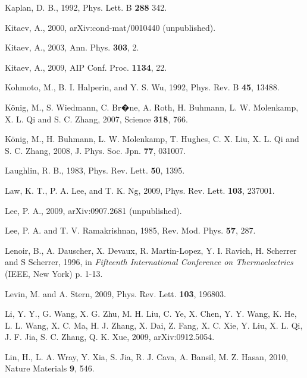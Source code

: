 \documentclass[twocolumn,floatfix,showpacs,rmp,aps]{revtex4}
\begin{document}
\begin{thebibliography}{99}
Kaplan, D. B., 1992,
Phys. Lett. B {\bf 288} 342.

Kitaev, A., 2000,
arXiv:cond-mat/0010440 (unpublished).

Kitaev, A., 2003,
Ann. Phys. {\bf 303}, 2.

Kitaev, A., 2009,
AIP Conf. Proc. {\bf 1134}, 22.

Kohmoto, M., B. I. Halperin, and Y. S. Wu, 1992,
Phys. Rev. B {\bf 45}, 13488.

K\"onig, M., S. Wiedmann, C. Br�ne, A. Roth, H. Buhmann, L. W. Molenkamp,
X. L. Qi and S. C. Zhang, 2007,
Science {\bf 318}, 766.

K\"onig, M., H. Buhmann, L. W. Molenkamp, T. Hughes, C. X. Liu,
X. L. Qi and S. C. Zhang, 2008,
J. Phys. Soc. Jpn. {\bf 77}, 031007.

Laughlin, R. B., 1983,
Phys. Rev. Lett. {\bf 50}, 1395.

Law, K. T., P. A. Lee, and T. K. Ng, 2009,
Phys. Rev. Lett. {\bf 103}, 237001.

Lee, P. A., 2009,
arXiv:0907.2681 (unpublished).

Lee, P. A.  and T. V. Ramakrishnan, 1985,
Rev. Mod. Phys. {\bf 57}, 287.

Lenoir, B., A. Dauscher, X. Devaux, R. Martin-Lopez, Y. I. Ravich,
H. Scherrer and S Scherrer, 1996, in
{\it Fifteenth International Conference on Thermoelectrics}
(IEEE, New York) p. 1-13.

Levin, M. and A. Stern, 2009,
Phys. Rev. Lett. {\bf 103}, 196803.

Li, Y. Y., G. Wang, X. G.  Zhu, M. H. Liu, C. Ye, X. Chen, Y. Y. Wang,
K. He, L. L. Wang, X. C. Ma, H. J. Zhang, X. Dai, Z. Fang, X. C. Xie,
Y. Liu, X. L. Qi, J. F. Jia, S. C. Zhang, Q. K. Xue, 2009,
arXiv:0912.5054.

Lin, H., L. A. Wray, Y. Xia, S. Jia, R. J. Cava, A. Bansil, M. Z. Hasan, 2010,
Nature Materials {\bf 9}, 546.


\end{thebibliography}
\end{document}
